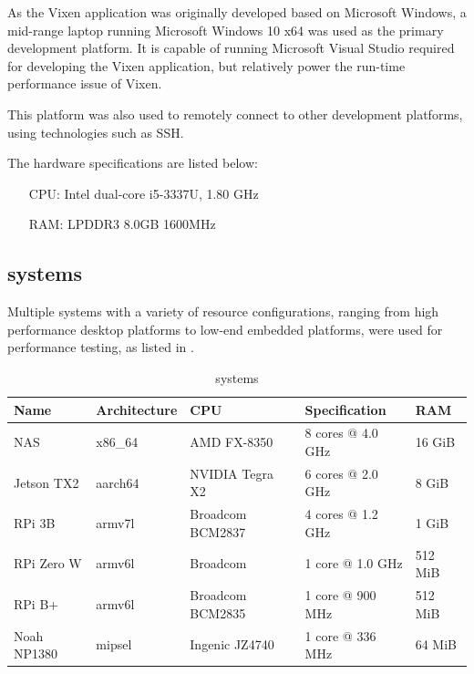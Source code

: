 As the Vixen application was originally developed based on Microsoft Windows,  a mid-range laptop running Microsoft Windows 10 x64 was used as the primary development platform. It is capable of running Microsoft Visual Studio  required for developing the Vixen application, but  relatively  power the run-time performance issue of Vixen.

This platform was also used to remotely connect to other development platforms, using technologies such as SSH.

The hardware specifications are listed below:

\begin{enumerate}[noitemsep]
  \item[CPU:]	Intel dual-core i5-3337U, 1.80 GHz
  \item[RAM:]	LPDDR3 8.0GB 1600MHz
\end{enumerate}

\subsection{ systems}
\label{sec:systems}

Multiple  systems with a variety of resource configurations, ranging from high performance desktop platforms to low-end embedded platforms, were used for performance testing, as listed in .

\begin{table}[t]
  \centering
  \begin{tabular}{l|l|l|l|l}
    \hline
    \textbf{Name} & \textbf{Architecture} & \textbf{CPU} & \textbf{Specification} & \textbf{RAM} \\
    \hline
    NAS         & x86\_64 & AMD FX-8350       & 8 cores @ 4.0 GHz  & 16 GiB   \\ \hline
    Jetson TX2  & aarch64 & NVIDIA Tegra X2   & 6 cores @ 2.0 GHz  & 8 GiB    \\ \hline
    RPi 3B      & armv7l  & Broadcom BCM2837  & 4 cores @ 1.2 GHz  & 1 GiB    \\ \hline
    RPi Zero W  & armv6l  & Broadcom          & 1 core @ 1.0 GHz   & 512 MiB  \\ \hline
    RPi B+      & armv6l  & Broadcom BCM2835  & 1 core @ 900 MHz   & 512 MiB  \\ \hline
    Noah NP1380 & mipsel  & Ingenic JZ4740    & 1 core @ 336 MHz   & 64 MiB   \\ \hline
  \end{tabular}
  \caption{\footnotesize {} systems}
  \label{tbl:linux}
\end{table}

